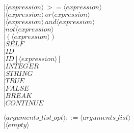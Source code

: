\documentclass[11pt]{article}
\begin{document}
\begin{enumerate}
                          \hspace*{3.2cm}$|   \langle expression\rangle \, >= \langle expression\rangle$\\
                          \hspace*{3.2cm}$|   \langle expression\rangle \, or \langle expression\rangle$\\
                          \hspace*{3.2cm}$|   \langle expression\rangle \, and \langle expression\rangle$\\
                          \color{black}
                          \hspace*{3.2cm}$|   not \langle expression\rangle$\\
                          \hspace*{3.2cm}$|   ( \langle expression\rangle )$\\
                          \hspace*{3.2cm}$|   SELF$\\
                          \hspace*{3.2cm}$|   ID$\\
                          \color{blue}
                          \hspace*{3.2cm}$|   ID[\langle expression\rangle]$\\
                          \color{black}
                          \hspace*{3.2cm}$|   INTEGER$\\
                          \hspace*{3.2cm}$|   STRING$\\
                          \hspace*{3.2cm}$|   TRUE$\\
                          \hspace*{3.2cm}$|   FALSE$\\
                          \color{blue}
                          \hspace*{3.2cm}$|   BREAK$\\
                          \hspace*{3.2cm}$|   CONTINUE$\\
                          \color{black}

$\langle arguments\_list\_opt\rangle      ::= \langle arguments\_list\rangle$\\
                          \hspace*{4.5cm}$|   \langle empty\rangle$\\


\end{enumerate}
\end{document}
